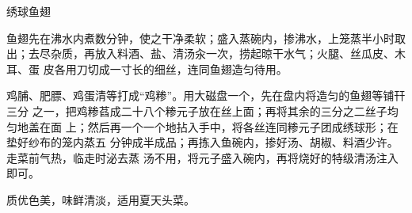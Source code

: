 \begin{recipe}{绣球鱼翅}

\ingredients



\preparation

\step 鱼翅先在沸水内煮数分钟，使之干净柔软；盛入蒸碗内，掺沸水，上笼蒸半小时取
出；去尽杂质，再放入料酒、盐、清汤汆一次，捞起晾干水气；火腿、丝瓜皮、木耳、蛋
皮各用刀切成一寸长的细丝，连同鱼翅造匀待用。

鸡脯、肥膘、鸡蛋清等打成“鸡糁”。用大磁盘一个，先在盘内将造匀的鱼翅等铺幵三分
之一，把鸡糁萏成二十八个糁元子放在丝上面；再将其余的三分之二丝子均匀地盖在面
上；然后再一个一个地拈入手中，将各丝连同糁元子团成绣球形；在垫好纱布的笼内蒸五
分钟成半成品；再拣入鱼碗内，掺好汤、胡椒、料酒少许。走菜前气热，临走时泌去蒸
汤不用，将元子盛入碗内，再将烧好的特级清汤注入即可。

\features

质优色美，味鲜清淡，适用夏天头菜。

\end{recipe}

